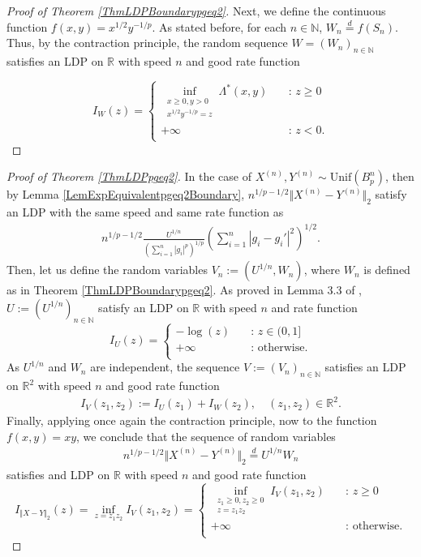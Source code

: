 \documentclass[10pt]{amsart}
\def\R{\mathbb{R}}
\def\N{\mathbb{N}}
\numberwithin{equation}{section}
\begin{document}
\begin{proof}[Proof of Theorem \ref{ThmLDPBoundarypgeq2}]
Next, we define the continuous function $f(x,y) = x^{1/2} y^{-1/p}$.
As stated before, for each $n\in \N$, $W_n \overset{d}{=} f(S_n)$. Thus, by the contraction principle, the random sequence $W = (W_n)_{n \in \N}$ satisfies an LDP on $\R$ with speed $n$ and good rate function 

\[   
I_W(z) = 
     \begin{cases}
       \displaystyle{\inf_{ \substack{x \geq 0, y> 0 \\ x^{1/2}y^{-1/p} = z}} \Lambda ^* (x,y)}  &\quad\text{: }z \geq 0\\
       + \infty &\quad\text{: }z < 0 . \\ 
     \end{cases}
\]
\end{proof}

\begin{proof}[Proof of Theorem \ref{ThmLDPpgeq2}]
In the case of $X^{(n)}, Y^{(n)} \sim \text{Unif}(B_p^n)$, then by Lemma \ref{LemExpEquivalentpgeq2Boundary}, $n^{1/p - 1/2} \Vert X^{(n)} - Y^{(n)} \Vert _2$ satisfy an LDP with the same speed and same rate function as
\begin{align*}
 n^{1/p - 1/2} \frac{U^{1/n}}{\left(\sum _{i=1}^n \left| g_i  \right|^p \right)^{1/p}} \left(  \sum_{i=1}^n \left| g_i - g_i' \right|^2 \right)^{1/2} .
\end{align*} 
Then, let us define the random variables $V_n:=(U^{1/n} , W_n)$, where $W_n$ is defined as in Theorem \ref{ThmLDPBoundarypgeq2}. As proved in Lemma 3.3 of \cite{GKR}, $U:=(U^{1/n})_{n \in \N}$ satisfy an LDP on $\R$ with speed $n$ and rate function 
\[   
I_U(z) = 
     \begin{cases}
       - \log (z) &\quad\text{: }z \in (0, 1]\\
       + \infty &\quad\text{: otherwise}. \\ 
     \end{cases}
\]
As $U^{1/n}$ and $W_n$ are independent, the sequence $V:=(V_n)_{n \in \N}$ satisfies an LDP on $\R^2$ with speed $n$ and good rate function
\begin{align*}
I_V(z_1,z_2) := I_U(z_1) + I_W(z_2), \quad (z_1,z_2)\in \R^2.
\end{align*}
Finally, applying once again the contraction principle, now to the function $f(x,y) = xy$, we conclude that the sequence of random variables 
\begin{align*}
n^{1/p - 1/2}\Vert X^{(n)}-Y^{(n)}\Vert _2 \overset{d}{=} U^{1/n} W_n 
\end{align*}
satisfies and LDP on $\R$ with speed $n$ and good rate function 
\[   
I_{\Vert X-Y \Vert _2}(z) = \inf _ {z=z_1 z_2} I_V(z_1,z_2) = 
     \begin{cases}
       \displaystyle{\inf_{ \substack{z_1 \geq 0, z_2 \geq 0 \\ z=z_1z_2}} I_V (z_1,z_2)}  &\quad\text{: }z \geq 0\\
       + \infty &\quad\text{: otherwise}. \\ 
     \end{cases}
\]
\end{proof}
\end{document}
